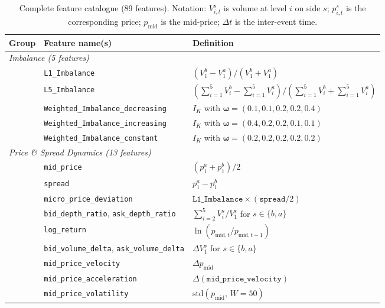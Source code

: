 \documentclass[11pt]{report}
\begin{document}
\begin{table}[H]
\centering
\caption{Complete feature catalogue (89 features). Notation: $V^s_{i,t}$ is volume at level $i$ on side $s$; $p^s_{i,t}$ is the corresponding price; $p_{\text{mid}}$ is the mid-price; $\Delta t$ is the inter-event time.}
\label{tab:full_feature_catalogue}
\small
\begin{tabular}{p{} p{} p{}}
\toprule
\textbf{Group} & \textbf{Feature name(s)} & \textbf{Definition} \\
\midrule
\multicolumn{3}{l}{\textit{Imbalance (5 features)}} \\
\addlinespace
& \texttt{L1\_Imbalance} & $(V^b_{1} - V^a_{1})/(V^b_{1} + V^a_{1})$ \\
& \texttt{L5\_Imbalance} & $(\sum_{i=1}^{5} V^b_i - \sum_{i=1}^{5} V^a_i)/(\sum_{i=1}^{5} V^b_i + \sum_{i=1}^{5} V^a_i)$ \\
& \texttt{Weighted\_Imbalance\_decreasing} & $I_K$ with $\boldsymbol{\omega} = (0.1, 0.1, 0.2, 0.2, 0.4)$~\cite{tao_2020} \\
& \texttt{Weighted\_Imbalance\_increasing} & $I_K$ with $\boldsymbol{\omega} = (0.4, 0.2, 0.2, 0.1, 0.1)$~\cite{tao_2020} \\
& \texttt{Weighted\_Imbalance\_constant} & $I_K$ with $\boldsymbol{\omega} = (0.2, 0.2, 0.2, 0.2, 0.2)$~\cite{tao_2020} \\
\midrule
\multicolumn{3}{l}{\textit{Price \& Spread Dynamics (13 features)}} \\
\addlinespace
& \texttt{mid\_price} & $(p^a_1 + p^b_1)/2$ \\
& \texttt{spread} & $p^a_1 - p^b_1$ \\
& \texttt{micro\_price\_deviation} & $\texttt{L1\_Imbalance} \times (\texttt{spread}/2)$ \\
& \texttt{bid\_depth\_ratio}, \texttt{ask\_depth\_ratio} & $\sum_{i=2}^{5} V^s_i / V^s_1$ for $s \in \{b,a\}$ \\
& \texttt{log\_return} & $\ln(p_{\text{mid},t} / p_{\text{mid},t-1})$ \\
& \texttt{bid\_volume\_delta}, \texttt{ask\_volume\_delta} & $\Delta V^s_1$ for $s \in \{b,a\}$ \\
& \texttt{mid\_price\_velocity} & $\Delta p_{\text{mid}}$ \\
& \texttt{mid\_price\_acceleration} & $\Delta(\texttt{mid\_price\_velocity})$ \\
& \texttt{mid\_price\_volatility} & $\text{std}(p_{\text{mid}},\, W{=}50)$ \\

\end{tabular}
\end{table}
\end{document}
